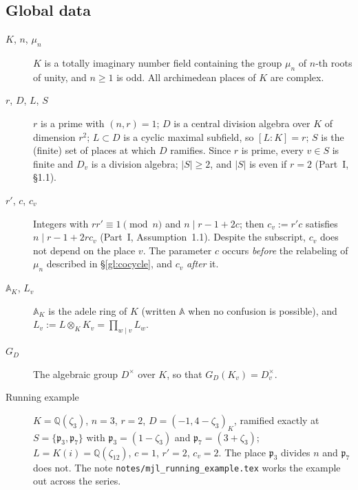 \subsection{Global data}\label{gl:global}
\begin{description}
\item[$K$, $n$, $\mu_n$] $K$ is a totally imaginary number field
containing the group $\mu_n$ of $n$-th roots of unity, and $n\ge1$ is
odd.  All archimedean places of $K$ are complex.
\item[$r$, $D$, $L$, $S$] $r$ is a prime with $(n,r)=1$; $D$ is a
central division algebra over $K$ of dimension $r^2$; $L\subset D$ is
a cyclic maximal subfield, so $[L:K]=r$; $S$ is the (finite) set of
places at which $D$ ramifies.  Since $r$ is prime, every $v\in S$ is
finite and $D_v$ is a division algebra; $|S|\ge2$, and $|S|$ is even
if $r=2$ (Part~I, \S1.1).
\item[$r'$, $c$, $c_v$] Integers with $rr'\equiv1\pmod n$ and
$n\mid r-1+2c$; then $c_v:=r'c$ satisfies $n\mid r-1+2rc_v$ (Part~I,
Assumption~1.1).  Despite the subscript, $c_v$ does not depend on the
place $v$.  The parameter $c$ occurs \emph{before} the relabeling of
$\mu_n$ described in \S\ref{gl:cocycle}, and $c_v$ \emph{after} it.
\item[$\mathbb A_K$, $L_v$] $\mathbb A_K$ is the adele ring of $K$
(written $\mathbb A$ when no confusion is possible), and
$L_v:=L\otimes_KK_v=\prod_{w\mid v}L_w$.
\item[$G_D$] The algebraic group $D^\times$ over $K$, so that
$G_D(K_v)=D_v^\times$.
\item[Running example] $K=\mathbb Q(\zeta_3)$, $n=3$, $r=2$,
$D=(-1,4-\zeta_3)_K$, ramified exactly at
$S=\{\mathfrak p_3,\mathfrak p_7\}$ with $\mathfrak p_3=(1-\zeta_3)$
and $\mathfrak p_7=(3+\zeta_3)$; $L=K(i)=\mathbb Q(\zeta_{12})$,
$c=1$, $r'=2$, $c_v=2$.  The place $\mathfrak p_3$ divides $n$ and
$\mathfrak p_7$ does not.  The note
\texttt{notes/mjl\_running\_example.tex} works the example out across
the series.
\end{description}

